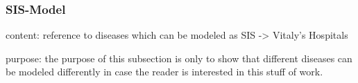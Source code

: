 \subsubsection{SIS-Model}
content: reference to diseases which can be modeled as SIS -> Vitaly's Hospitals


purpose: the purpose of this subsection is only to show that different diseases can be modeled differently in case the reader is interested in this stuff of work. 